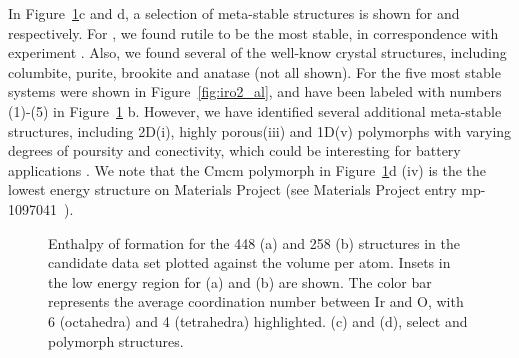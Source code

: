 %

In Figure~\ref{fig:E_vs_V}c and d, a selection of meta-stable structures is shown for \IrOtwo and \IrOthree respectively.
%
For \IrOtwo, we found rutile to be the most stable,
in correspondence with experiment \cite{}.
%
Also, we found several of the well-know \IrOtwo crystal structures, including columbite, purite, brookite and anatase (not all shown).
%
For \IrOthree the five most stable systems were shown in Figure~\ref{fig:iro2_al},
and have been labeled with numbers (1)-(5) in Figure~\ref{fig:E_vs_V} b.
%
However, we have identified several additional meta-stable structures, including 2D(i), highly porous(iii) and 1D(v) polymorphs with varying degrees of poursity and conectivity,
which could be interesting for battery applications \cite{}.
%
We note that the \IrOthree Cmcm polymorph in Figure~\ref{fig:E_vs_V}d (iv) is the the lowest energy \IrOthree structure on Materials Project
(see Materials Project entry mp-1097041~\cite{mp-1097041}).



\begin{figure}[!htb]
\centering
{}
\caption{\label{fig:E_vs_V}
%
Enthalpy of formation for the \num{448} \IrOtwo (a) and \num{258} \IrOthree (b) structures in the candidate data set plotted against the volume per atom.
%
Insets in the low energy region for (a) and (b) are shown.
%
The color bar represents the average coordination number between Ir and O, with 6 (octahedra) and 4 (tetrahedra) highlighted.
%
(c) and (d), select \IrOtwo and \IrOthree polymorph structures.
}
\end{figure}






